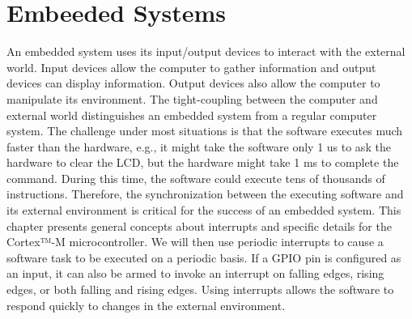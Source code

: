 \chapter{Embeeded Systems}

An embedded system uses its input/output devices to interact with the external world. Input devices allow the computer to gather information and output devices can display information. Output devices also allow the computer to manipulate its environment. The tight-coupling between the computer and external world distinguishes an embedded system from a regular computer system. The challenge under most situations is that the software executes much faster than the hardware, e.g., it might take the software only 1 us to ask the hardware to clear the LCD, but the hardware might take 1 ms to complete the command. During this time, the software could execute tens of thousands of instructions. Therefore, the synchronization between the executing software and its external environment is critical for the success of an embedded system. This chapter presents general concepts about interrupts and specific details for the Cortex™-M microcontroller. We will then use periodic interrupts to cause a software task to be executed on a periodic basis. If a GPIO pin is configured as an input, it can also be armed to invoke an interrupt on falling edges, rising edges, or both falling and rising edges. Using interrupts allows the software to  respond quickly to changes in the external environment.